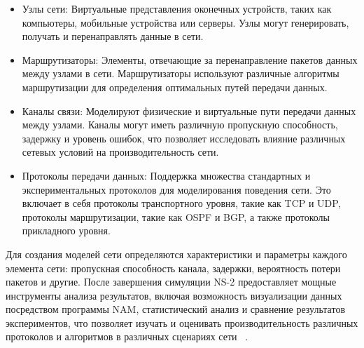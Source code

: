 \begin{itemize}
\item Узлы сети: Виртуальные представления оконечных устройств, таких как компьютеры, мобильные устройства или серверы. 
Узлы могут генерировать, получать и перенаправлять данные в сети.
\item Маршрутизаторы: Элементы, отвечающие за перенаправление пакетов данных между узлами в сети. 
Маршрутизаторы используют различные алгоритмы маршрутизации для определения оптимальных путей передачи данных.
\item Каналы связи: Моделируют физические и виртуальные пути передачи данных между узлами. 
Каналы могут иметь различную пропускную способность, задержку и уровень ошибок, что позволяет исследовать влияние различных сетевых условий на производительность сети.
\item Протоколы передачи данных: Поддержка множества стандартных и экспериментальных протоколов для моделирования поведения сети. 
Это включает в себя протоколы транспортного уровня, такие как TCP и UDP, протоколы маршрутизации, такие как OSPF и BGP, а также протоколы прикладного уровня.
\end{itemize}


Для создания моделей сети определяются характеристики и
параметры каждого элемента сети: пропускная способность канала,
задержки, вероятность потери пакетов и другие. После завершения
симуляции NS-2 предоставляет мощные инструменты анализа результатов,
включая возможность визуализации данных посредством программы NAM,  
статистический анализ и сравнение результатов экспериментов, что позволяет 
изучать и оценивать производительность различных протоколов и алгоритмов 
в различных сценариях сети ~\cite{NS2-1, NS2-2}.

